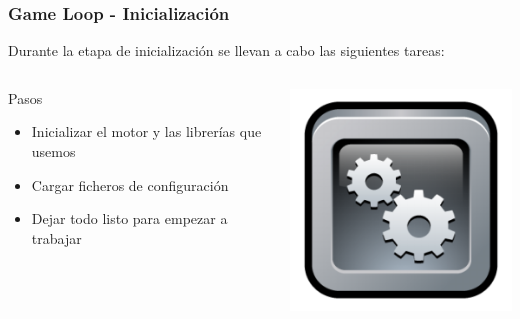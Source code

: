 \begin{frame}
	\frametitle{Game Loop - Inicialización}
	
	Durante la etapa de inicialización se llevan a cabo las siguientes
	tareas:
	
	\begin{columns}[c]
	\column{200pt}
		
	\begin{block}{Pasos}
		\begin{itemize}
			\item Inicializar el motor y las librerías que usemos
			\item Cargar ficheros de configuración
			\item Dejar todo listo para empezar a trabajar
		\end{itemize}            
	\end{block}
	
	\column{100pt}
	
	\begin{center}
		\includegraphics[scale=0.25]{img/engine.png}
	\end{center}	
	
	\end{columns}
	
\end{frame}

